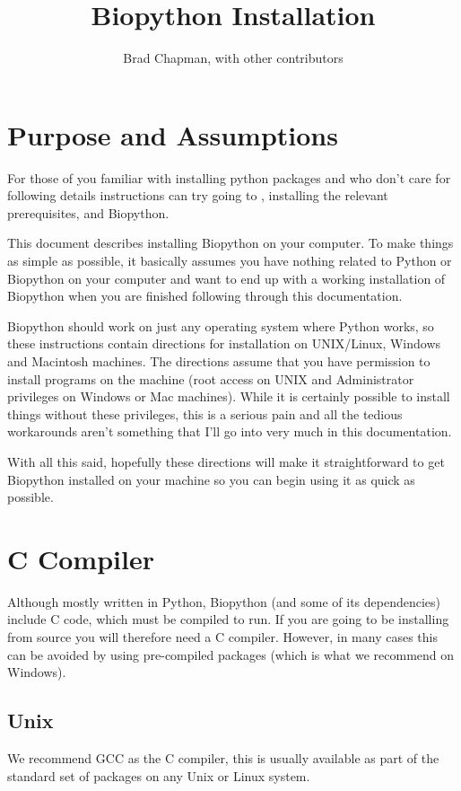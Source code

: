 \documentclass{article}
\begin{document}
\title{Biopython Installation}
\author{Brad Chapman, with other contributors}

\maketitle
\tableofcontents

\section{Purpose and Assumptions}

For those of you familiar with installing python packages and who don't
care for following details instructions can try going to
, installing
the relevant prerequisites, and Biopython.

This document describes installing Biopython on your computer. To make
things as simple as possible, it basically assumes you have nothing
related to Python or Biopython on your computer and want to end up with
a working installation of Biopython when you are finished following
through this documentation. 

Biopython should work on just any operating system where Python works,
so these instructions contain directions for installation on UNIX/Linux,
Windows and Macintosh machines. The directions assume 
that you have permission to install programs on the machine
(root access on UNIX and Administrator privileges on Windows or Mac
machines). While it is certainly possible to install things without
these privileges, this is a serious pain and all the tedious workarounds
aren't something that I'll go into very much in this documentation.

With all this said, hopefully these directions will make it
straightforward to get Biopython installed on your machine so you can
begin using it as quick as possible.

\section{C Compiler}

Although mostly written in Python, Biopython (and some of its dependencies)
include C code, which must be compiled to run. If you are going to be
installing from source you will therefore need a C compiler. However,
in many cases this can be avoided by using pre-compiled packages (which
is what we recommend on Windows).

\subsection{Unix}
We recommend GCC as the C compiler, this is usually available as part
of the standard set of packages on any Unix or Linux system.
\end{document}
